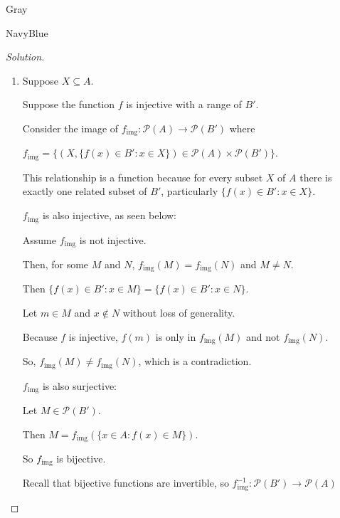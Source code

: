 \documentclass[12pt]{amsart}
\theoremstyle{named}
\newenvironment{soln}
{\begin{color}{Gray}\begin{framed}\begin{color}{NavyBlue}\begin{proof}[Solution]
\doublespacing}
{\end{proof}\end{color}\end{framed}\end{color}}
\theoremstyle{definition}
\begin{document}
\begin{soln}
	\phantom{ }
    
    \begin{enumerate}
        \item 
        \phantom{ }

        \noindent Suppose $X \subseteq A$.

        \noindent Suppose the function $f$ is injective with a range of $B'$.

        \noindent Consider the image of $f_\text{img} : \mathscr P(A) \rightarrow \mathscr P(B')$
        where 
        
        \noindent $f_\text{img} = \{(X,\{f(x) \in B' : x \in X\}) \in \mathscr P(A) \times \mathscr P(B')\}$.

        \noindent This relationship is a function because for every subset $X$ of $A$
        there is exactly one related subset of $B'$, particularly $\{f(x) \in B' : x \in X\}$.

        \noindent $f_\text{img}$ is also injective, as seen below:

        \begin{adjustwidth}{2em}{0em}
            \noindent Assume $f_\text{img}$ is not injective.

            \noindent Then, for some $M$ and $N$, $f_\text{img}(M) = f_\text{img}(N)$ and $M \neq N$.

            \noindent Then $\{f(x) \in B' : x \in M\} = \{f(x) \in B' : x \in N\}$.

            \noindent Let $m \in M$ and $x \notin N$ without loss of generality.

            \noindent Because $f$ is injective, $f(m)$ is only in $f_\text{img}(M)$
            and not $f_\text{img}(N)$.

            \noindent So, $f_\text{img}(M) \neq f_\text{img}(N)$, which is a contradiction.
        \end{adjustwidth}

        \noindent $f_\text{img}$ is also surjective:

        \begin{adjustwidth}{2em}{0em}
            Let $M \in \mathscr P(B')$.

            \noindent Then $M = f_\text{img}(\{x \in A : f(x) \in M\})$.
        \end{adjustwidth}

        \noindent So $f_\text{img}$ is bijective. 

        \noindent Recall that bijective functions are invertible, so $f^{-1}_{\text{img}} : 
        \mathscr P(B') \rightarrow \mathscr P(A)$


\end{enumerate}
\end{soln}
\end{document}
